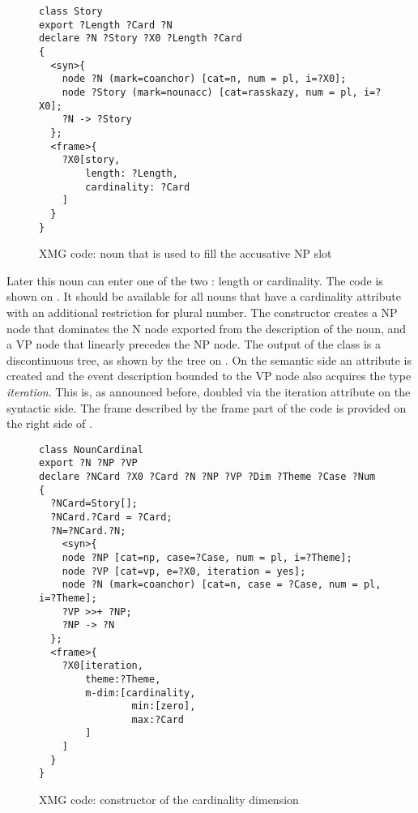\begin{figure}
\begin{lstlisting}[style=xmg,basicstyle=\small\ttfamily]
class Story
export ?Length ?Card ?N
declare ?N ?Story ?X0 ?Length ?Card
{
  <syn>{
    node ?N (mark=coanchor) [cat=n, num = pl, i=?X0];
    node ?Story (mark=nounacc) [cat=rasskazy, num = pl, i=?X0];
    ?N -> ?Story
  };
  <frame>{
    ?X0[story,
        length: ?Length,
        cardinality: ?Card
    ]
  }
}
\end{lstlisting}
\caption{XMG code: noun that is used to fill the accusative NP slot \label{xmg:noun}}
\end{figure}

Later this noun can enter one of the two : length or cardinality. The  code is shown on . It should be available for all nouns that have a cardinality attribute with an additional restriction for plural number. The constructor creates a NP node that dominates the N node exported from the description of the noun, and a VP node that linearly precedes the NP node. The output of the class is a discontinuous tree, as shown by the tree on . On the semantic side an \MDIM attribute is created and the event description bounded to the VP node also acquires the type \textit{iteration}. This is, as announced before, doubled via the iteration attribute on the syntactic side. The frame described by the frame part of the code is provided on the right side of .

\begin{figure}
\begin{lstlisting}[style=xmg,basicstyle=\small\ttfamily]
class NounCardinal
export ?N ?NP ?VP
declare ?NCard ?X0 ?Card ?N ?NP ?VP ?Dim ?Theme ?Case ?Num 
{
  ?NCard=Story[];
  ?NCard.?Card = ?Card;
  ?N=?NCard.?N;
    <syn>{
    node ?NP [cat=np, case=?Case, num = pl, i=?Theme];
    node ?VP [cat=vp, e=?X0, iteration = yes];
    node ?N (mark=coanchor) [cat=n, case = ?Case, num = pl, i=?Theme];
    ?VP >>+ ?NP;
    ?NP -> ?N
  };
  <frame>{
    ?X0[iteration,
        theme:?Theme,
        m-dim:[cardinality,
                min:[zero],
                max:?Card
        ]
    ]
  }
}
\end{lstlisting}
\caption{XMG code: constructor of the cardinality dimension \label{xmg:cardinality}}
\end{figure}

